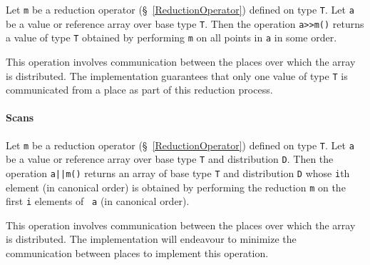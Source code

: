 Let {\tt m} be a reduction operator (\S~\ref{ReductionOperator})
defined on type {\tt T}. Let {\tt a} be a value or reference array
over base type {\tt T}. Then the operation {\tt a>>m()} returns a
value of type {\tt T} obtained by performing {\tt m} on all points in
{\tt a} in some order.

This operation involves communication between the places over which
the array is distributed. The \Xten{} implementation guarantees that
only one value of type {\tt T} is communicated from a place as part of
this reduction process.

\paragraph{Scans}\label{ArrayScans}

Let {\tt m} be a reduction operator (\S~\ref{ReductionOperator})
defined on type {\tt T}. Let {\tt a} be a value or reference array
over base type {\tt T} and distribution {\tt D}. Then the operation
{\tt a||m()} returns an array of base type {\tt T} and distribution
{\tt D} whose {\tt i}th element (in canonical order) is obtained by
performing the reduction {\tt m} on the first {\tt i} elements of {\tt
a} (in canonical order).

This operation involves communication between the places over which
the array is distributed. The \Xten{} implementation will endeavour to
minimize the communication between places to implement this operation.

